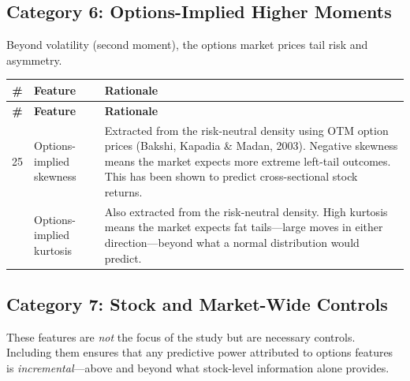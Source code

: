 \documentclass[11pt,a4paper]{article}
\begin{document}
\subsection{Category 6: Options-Implied Higher Moments}

Beyond volatility (second moment), the options market prices tail risk and asymmetry.

\begin{longtable}{@{}cp{3cm}p{8cm}@{}}
\toprule
\textbf{\#} & \textbf{Feature} & \textbf{Rationale} \\
\midrule
\endfirsthead
\toprule
\textbf{\#} & \textbf{Feature} & \textbf{Rationale} \\
\midrule
\endhead
25 & Options-implied skewness & Extracted from the risk-neutral density using OTM option prices (Bakshi, Kapadia \& Madan, 2003). Negative skewness means the market expects more extreme left-tail outcomes. This has been shown to predict cross-sectional stock returns. \\
\addlinespace
26 & Options-implied kurtosis & Also extracted from the risk-neutral density. High kurtosis means the market expects fat tails---large moves in either direction---beyond what a normal distribution would predict. \\
\bottomrule
\end{longtable}

\subsection{Category 7: Stock and Market-Wide Controls}

These features are \emph{not} the focus of the study but are necessary controls. Including them ensures that any predictive power attributed to options features is \emph{incremental}---above and beyond what stock-level information alone provides.
\end{document}
